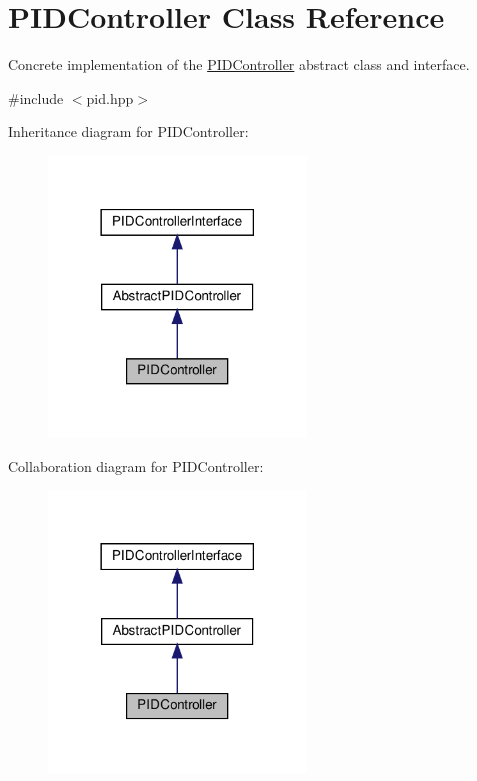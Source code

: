 \hypertarget{classPIDController}{}\section{P\+I\+D\+Controller Class Reference}
\label{classPIDController}


Concrete implementation of the \hyperlink{classPIDController}{P\+I\+D\+Controller} abstract class and interface.  




{\ttfamily \#include $<$pid.\+hpp$>$}



Inheritance diagram for P\+I\+D\+Controller\+:\nopagebreak
\begin{figure}[H]
\begin{center}
\leavevmode
\includegraphics[width=194pt]{classPIDController__inherit__graph}
\end{center}
\end{figure}


Collaboration diagram for P\+I\+D\+Controller\+:\nopagebreak
\begin{figure}[H]
\begin{center}
\leavevmode
\includegraphics[width=194pt]{classPIDController__coll__graph}
\end{center}
\end{figure}
